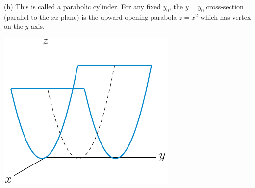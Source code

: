 \begin{solution}
(h)
This is called a parabolic cylinder. For any fixed $y_0$, the  
$y=y_0$ cross-section (parallel to the $xz$-plane) is the upward
opening parabola $z=x^2$ which has vertex on the $y$-axis.
\begin{center}
     \includegraphics{fig/parabolicCylinder.pdf}
\end{center}






\end{solution}






